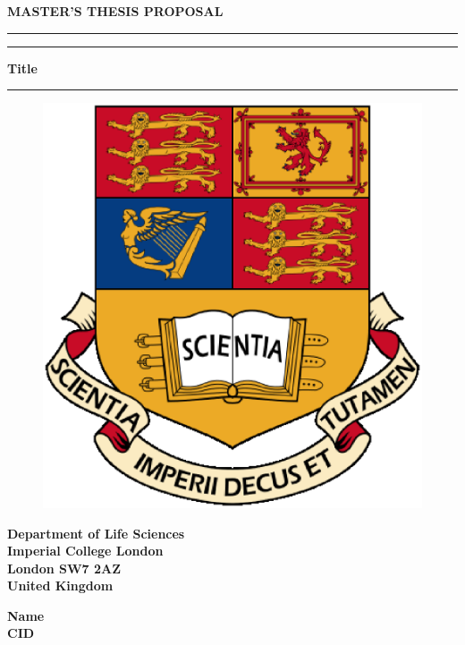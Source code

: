 \documentclass[11pt,twoside]{article}
\begin{document}
\thispagestyle{fancy}
\vspace{0.75cm}
\begin{center}
{\Large\textbf{MASTER'S THESIS PROPOSAL}\\
\vspace{2.5cm}
\hrule


\thispagestyle{empty}

\hrule
\vspace{0.5cm}
\LARGE{\textbf{Title}}
 \vspace{0.5cm}
\hrule
}

\vspace{1.5cm}

\begin{figure}[!h]
\centering
\includegraphics[scale=0.4]{IC_Crest.eps}
\end{figure}

\vspace{1.5cm}

\begin{center}
\large{\bf{Department of Life Sciences\\Imperial College London\\London SW7 2AZ\\United Kingdom}}
\end{center}

\vspace{3.5cm}

\begin{Large}
\textbf{Name}\\
\textbf{CID}
\end{Large}

\end{center}
\end{document}
